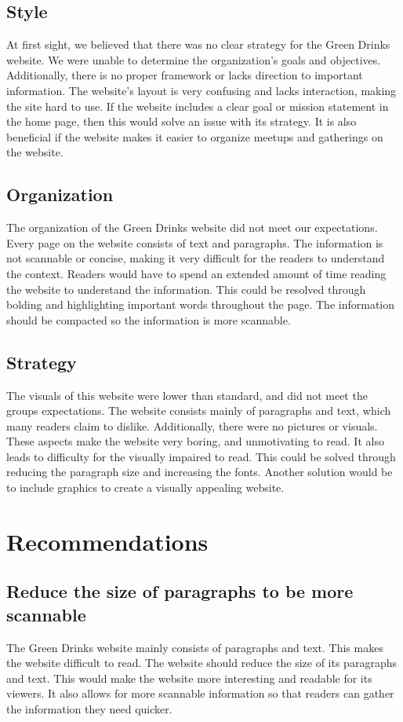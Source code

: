 \documentclass[12pt]{article}
\begin{document}
\subsection*{Style}
At first sight, we believed that there was no clear strategy for the Green Drinks website. We were unable to determine the organization's goals and objectives. Additionally, there is no proper framework or lacks direction to important information. The website’s layout is very confusing and lacks interaction, making the site hard to use. If the website includes a clear goal or mission statement in the home page, then this would solve an issue with its strategy. It is also beneficial if the website makes it easier to organize meetups and gatherings on the website. 
\subsection*{Organization}
The organization of the Green Drinks website did not meet our expectations. Every page on the website consists of text and paragraphs. The information is not scannable or concise, making it very difficult for the readers to understand the context. Readers would have to spend an extended amount of time reading the website to understand the information. This could be resolved through bolding and highlighting important words throughout the page. The information should be compacted so the information is more scannable. 
\subsection*{Strategy}
The visuals of this website were lower than standard, and did not meet the groups expectations. The website consists mainly of paragraphs and text, which many readers claim to dislike. Additionally, there were no pictures or visuals. These aspects make the website very boring, and unmotivating to read. It also leads to difficulty for the visually impaired to read. This could be solved through reducing the paragraph size and increasing the fonts. Another solution would be to include graphics to create a visually appealing website.
\section{Recommendations }
\subsection*{Reduce the size of paragraphs to be more scannable}
The Green Drinks website mainly consists of paragraphs and text. This makes the website difficult to read. The website should reduce the size of its paragraphs and text. This would make the website more interesting and readable for its viewers. It also allows for more scannable information so that readers can gather the information they need quicker.
\end{document}
